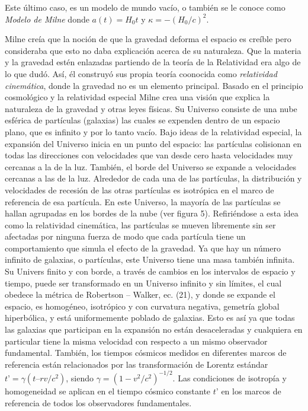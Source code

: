 \documentclass[11pt]{article}
\begin{document}
{{    
    Este último caso, es un modelo de mundo vacío, o también se le conoce como {\textit{Modelo de Milne}} donde $a(t) = H_0 t$ y $\kappa = - (H_0/c)^2$. 
    
    
    \newpage
    
    Milne creía que la noción de que la gravedad deforma el espacio es creíble pero consideraba que esto no daba explicación acerca de su naturaleza. Que la materia y la gravedad estén enlazadas partiendo de la teoría de la Relatividad era algo de lo que dudó. Así, él construyó sus propia teoría coonocida como {\textit{relatividad cinemática}}, donde la gravedad no es un elemento principal. Basado en el principio cosmológico y la relatividad especial Milne crea una visión que explica la naturaleza de la gravedad y otras leyes físicas. 
    Su Universo consiste de una nube esférica de partículas (galaxias) las cuales se expenden dentro de un espacio plano, que es infinito y por lo tanto vacío. Bajo ideas de la relatividad especial, la expansión del Universo inicia en un punto del espacio: las partículas colisionan en todas las direcciones con velocidades que van desde cero hasta velocidades muy cercanas a la de la luz. También, el borde del Universo se expande a velocidades cercanas a las de la luz. Alrededor de cada una de las partículas, la distribución y velocidades de recesión de las otras partículas es isotrópica en el marco de referencia de esa partícula. En este Universo, la mayoría de las partículas se hallan agrupadas en los bordes de la nube (ver figura 5). Refiriéndose a esta idea como la relatividad cinemática, las partículas se mueven libremente sin ser afectadas por ninguna fuerza de modo que cada partícula tiene un comportamiento que simula el efecto de la gravedad. 
    Ya que hay un número infinito de galaxias, o partículas, este Universo tiene una masa también infinita. Su Univers finito y con borde, a través de cambios en los intervalos de espacio y tiempo, puede ser transformado en un Universo infinito y sin límites, el cual obedece la métrica de Robertson – Walker, ec. (21), y donde se expande el espacio, es homogéneo, isotrópico y con curvatura negativa, gemetría global hiperbólica, y está uniformemente poblado de galaxias. Esto es así ya que todas las galaxias que participan en la expansión no están desaceleradas y cualquiera en particular tiene la misma velocidad con respecto a un mismo observador fundamental. También, los tiempos cósmicos medidos en diferentes marcos de referencia están relacionados por las transformación de Lorentz estándar $t’ = \gamma(t – rv/c^2)$, siendo $\gamma = (1-v^2/c^2)^{-1/2}$. Las condiciones de isotropía y homogeneidad se aplican en el tiempo cósmico constante $t’$ en los marcos de referencia de todos los observadores fundamentales. 
    
}}
\end{document}
